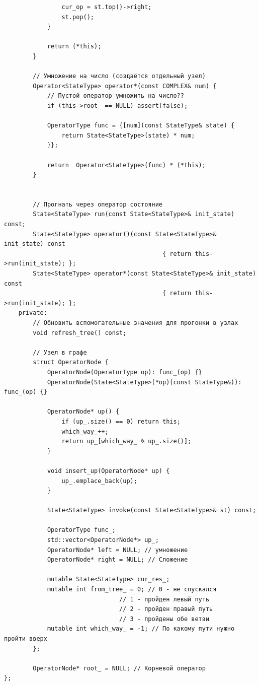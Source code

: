 \documentclass[12pt,fleqn]{article}
\begin{document}
\begin{mdframed}[linecolor=black, topline=true, bottomline=true,
    leftline=false, rightline=false]
\begin{verbatim}
                cur_op = st.top()->right;
                st.pop();
            }

            return (*this);
        }

        // Умножение на число (создаётся отдельный узел)
        Operator<StateType> operator*(const COMPLEX& num) {
            // Пустой оператор умножить на число??
            if (this->root_ == NULL) assert(false); 

            OperatorType func = {[num](const StateType& state) {
                return State<StateType>(state) * num;
            }};

            return  Operator<StateType>(func) * (*this);
        }


        // Прогнать через оператор состояние
        State<StateType> run(const State<StateType>& init_state) const;
        State<StateType> operator()(const State<StateType>& init_state) const 
                                            { return this->run(init_state); };
        State<StateType> operator*(const State<StateType>& init_state) const 
                                            { return this->run(init_state); };
    private:
        // Обновить вспомогательные значения для прогонки в узлах
        void refresh_tree() const;

        // Узел в графе
        struct OperatorNode {
            OperatorNode(OperatorType op): func_(op) {}
            OperatorNode(State<StateType>(*op)(const StateType&)): func_(op) {}

            OperatorNode* up() { 
                if (up_.size() == 0) return this;
                which_way_++;
                return up_[which_way_ % up_.size()];
            }

            void insert_up(OperatorNode* up) {
                up_.emplace_back(up);
            }

            State<StateType> invoke(const State<StateType>& st) const;

            OperatorType func_;
            std::vector<OperatorNode*> up_;
            OperatorNode* left = NULL; // умножение
            OperatorNode* right = NULL; // Сложение

            mutable State<StateType> cur_res_;
            mutable int from_tree_ = 0; // 0 - не спускался
                                // 1 - пройден левый путь
                                // 2 - пройден правый путь
                                // 3 - пройдены обе ветви
            mutable int which_way_ = -1; // По какому пути нужно пройти вверх
        };

        OperatorNode* root_ = NULL; // Корневой оператор
};
\end{verbatim}
\end{mdframed}
\end{document}
